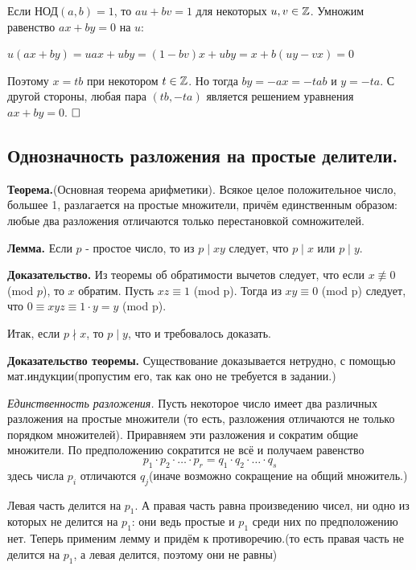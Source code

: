 \documentclass[a4paper, 10pt]{article}
\begin{document}
Если НОД$(a, b) = 1$, то $au + bv = 1$ для некоторых $u, v \in \mathbb{Z}$. Умножим равенство $ax + by = 0$ на $u$:

\begin{center}
    $\displaystyle u(ax + by) = uax + uby = (1 - bv)x + uby = x + b(uy - vx) = 0$
\end{center}

Поэтому $x = tb$ при некотором $t \in \mathbb{Z}$. Но тогда $by = -ax = -tab$ и $y = -ta$. С другой
стороны, любая пара $(tb, -ta)$ является решением уравнения $ax + by = 0$. $\hfill \square$

\subsection{Однозначность разложения на простые делители.}

\textbf{Теорема.}(Основная теорема арифметики). Всякое целое положительное число, большее 1, разлагается на простые множители, причём единственным образом: любые два разложения отличаются только перестановкой сомножителей.

\textbf{Лемма.} Если $p$ - простое число, то из $p \mid xy$ следует, что $p \mid x$ или $p \mid y$.

\textbf{Доказательство.} Из теоремы об обратимости вычетов следует, что если $x \not\equiv 0$ (mod $p$), то $x$ обратим. Пусть $xz \equiv 1$ (mod p). Тогда из $xy \equiv 0$ (mod p) следует, что $0 \equiv xyz \equiv 1 \cdot y = y$ (mod p).

Итак, если $p \nmid x$, то $p \mid y$, что и требовалось доказать.

\textbf{Доказательство теоремы.} Существование доказывается нетрудно, с помощью мат.индукции(пропустим его, так как оно не требуется в задании.)

\textit{Единственность разложения.} Пусть некоторое число имеет два различных разложения на простые множители (то есть, разложения отличаются не только порядком множителей). Приравняем эти разложения и сократим общие множители. По
предположению сократится не всё и получаем равенство $$p_1 \cdot p_2 \cdot \dots \cdot p_r = q_1 \cdot q_2 \cdot \dots \cdot q_s$$ здесь числа $p_i$ отличаются $q_j$(иначе возможно сокращение на общий множитель.)

Левая часть делится на $p_1$. А правая часть равна произведению чисел, ни одно из которых не делится на $p_1$: они ведь простые и $p_1$ среди них по предположению нет. Теперь применим лемму и придём к противоречию.(то есть правая часть не делится на $p_1$, а левая делится, поэтому они не равны)
\end{document}
